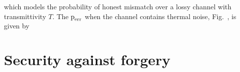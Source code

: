 \noindent which models the probability of honest mismatch over a lossy channel with transmittivity $T$. The $\text{p}_{\text{err}}$ when the channel contains thermal noise, Fig.~, is given by 

\section{Security against forgery}

























































